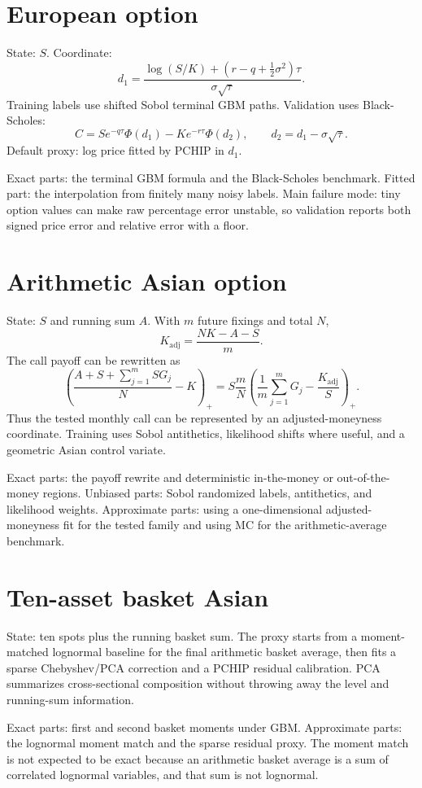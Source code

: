 \documentclass[11pt,oneside]{book}
\theoremstyle{definition}
\begin{document}
\section{European option}
State: \(S\). Coordinate:
\[
  d_1=\frac{\log(S/K)+(r-q+\tfrac12\sigma^2)\tau}{\sigma\sqrt{\tau}}.
\]
Training labels use shifted Sobol terminal GBM paths. Validation uses Black-Scholes:
\[
  C=S e^{-q\tau}\Phi(d_1)-K e^{-r\tau}\Phi(d_2),\qquad d_2=d_1-\sigma\sqrt{\tau}.
\]
Default proxy: log price fitted by PCHIP in \(d_1\).

Exact parts: the terminal GBM formula and the Black-Scholes benchmark. Fitted part: the interpolation from finitely many noisy labels. Main failure mode: tiny option values can make raw percentage error unstable, so validation reports both signed price error and relative error with a floor.

\section{Arithmetic Asian option}
State: \(S\) and running sum \(A\). With \(m\) future fixings and total \(N\),
\[
  K_{\mathrm{adj}}=\frac{NK-A-S}{m}.
\]
The call payoff can be rewritten as
\[
  \left(\frac{A+S+\sum_{j=1}^m S G_j}{N}-K\right)_+
  =
  S\frac{m}{N}\left(\frac1m\sum_{j=1}^mG_j-\frac{K_{\mathrm{adj}}}{S}\right)_+.
\]
Thus the tested monthly call can be represented by an adjusted-moneyness coordinate. Training uses Sobol antithetics, likelihood shifts where useful, and a geometric Asian control variate.

Exact parts: the payoff rewrite and deterministic in-the-money or out-of-the-money regions. Unbiased parts: Sobol randomized labels, antithetics, and likelihood weights. Approximate parts: using a one-dimensional adjusted-moneyness fit for the tested family and using MC for the arithmetic-average benchmark.

\section{Ten-asset basket Asian}
State: ten spots plus the running basket sum. The proxy starts from a moment-matched lognormal baseline for the final arithmetic basket average, then fits a sparse Chebyshev/PCA correction and a PCHIP residual calibration. PCA summarizes cross-sectional composition without throwing away the level and running-sum information.

Exact parts: first and second basket moments under GBM. Approximate parts: the lognormal moment match and the sparse residual proxy. The moment match is not expected to be exact because an arithmetic basket average is a sum of correlated lognormal variables, and that sum is not lognormal.
\end{document}
